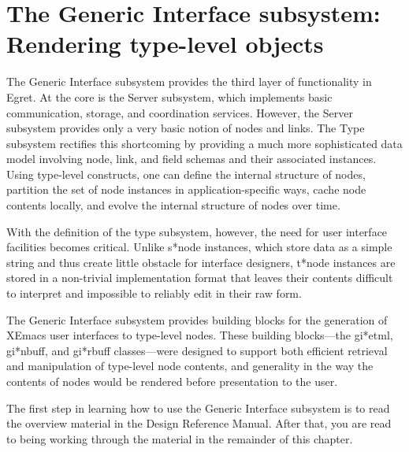
\setcounter{chapter}{3}   %
\chapter{The Generic Interface subsystem: Rendering type-level objects}

The Generic Interface subsystem provides the third layer of functionality
in Egret.  At the core is the Server subsystem, which implements basic
communication, storage, and coordination services.  However, the Server
subsystem provides only a very basic notion of nodes and links.  The Type
subsystem rectifies this shortcoming by providing a much more sophisticated
data model involving node, link, and field schemas and their associated
instances.  Using type-level constructs, one can define the internal
structure of nodes, partition the set of node instances in
application-specific ways, cache node contents locally, and evolve the
internal structure of nodes over time.

With the definition of the type subsystem, however, the need for user
interface facilities becomes critical.  Unlike s*node instances, which
store data as a simple string and thus create little obstacle for interface
designers, t*node instances are stored in a non-trivial implementation
format that leaves their contents difficult to interpret and impossible to
reliably edit in their raw form.

The Generic Interface subsystem provides building blocks for the generation
of XEmacs user interfaces to type-level nodes.  These building blocks---the
gi*etml, gi*nbuff, and gi*rbuff classes---were designed to support both
efficient retrieval and manipulation of type-level node contents, and
generality in the way the contents of nodes would be rendered before
presentation to the user.

The first step in learning how to use the Generic Interface subsystem is to
read the overview material in the Design Reference Manual.  After that, you
are read to being working through the material in the remainder of this
chapter.










